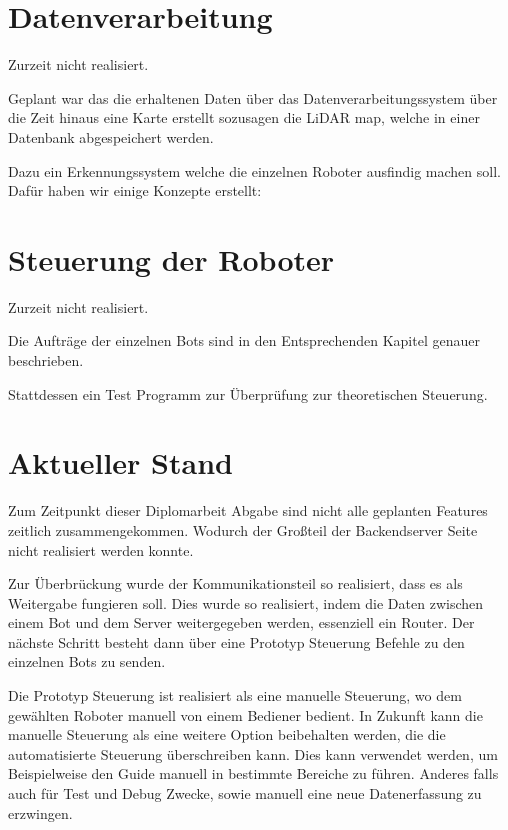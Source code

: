 \section{Datenverarbeitung}
Zurzeit nicht realisiert.

Geplant war das die erhaltenen Daten über das Datenverarbeitungssystem 
über die Zeit hinaus eine Karte erstellt sozusagen die LiDAR map,
welche in einer Datenbank abgespeichert werden.

Dazu ein Erkennungssystem welche die einzelnen Roboter ausfindig machen soll.
Dafür haben wir einige Konzepte erstellt:

\section{Steuerung der Roboter}
\label{subsec:backend_robot_detection}
Zurzeit nicht realisiert.

Die Aufträge der einzelnen Bots sind in den Entsprechenden Kapitel genauer beschrieben.

Stattdessen ein Test Programm zur Überprüfung zur theoretischen Steuerung.

\section{Aktueller Stand}
Zum Zeitpunkt dieser Diplomarbeit Abgabe sind nicht alle geplanten Features zeitlich zusammengekommen.
Wodurch der Großteil der Backendserver Seite nicht realisiert werden konnte.

Zur Überbrückung wurde der Kommunikationsteil so realisiert, dass es als Weitergabe fungieren soll.
Dies wurde so realisiert, indem die Daten zwischen einem Bot und dem Server weitergegeben werden, 
essenziell ein Router. 
Der nächste Schritt besteht dann über eine Prototyp Steuerung 
Befehle zu den einzelnen Bots zu senden.

Die Prototyp Steuerung ist realisiert als eine manuelle Steuerung, 
wo dem gewählten Roboter manuell von einem Bediener bedient.
In Zukunft kann die manuelle Steuerung als eine weitere Option beibehalten werden, 
die die automatisierte Steuerung überschreiben kann. 
Dies kann verwendet werden, um Beispielweise den Guide manuell in bestimmte Bereiche zu führen.
Anderes falls auch für Test und Debug Zwecke, sowie manuell eine neue Datenerfassung zu erzwingen.

